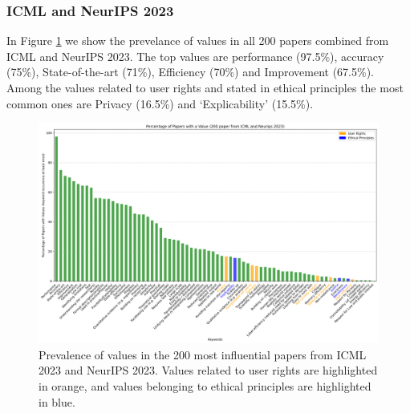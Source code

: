 \documentclass{article}
\begin{document}
\subsubsection{ICML and NeurIPS 2023}
In Figure \ref{fig:percentage_both_conferences} we show the prevelance of values in all 200 papers combined from ICML and NeurIPS 2023. The top values are performance (97.5\%), accuracy (75\%), 
State-of-the-art (71\%), Efficiency (70\%) and Improvement (67.5\%). Among the values related to user rights and stated in 
ethical principles the most common ones are Privacy (16.5\%) and `Explicability' (15.5\%). 

\begin{figure}[H]
    \centering
    \includegraphics[width=\textwidth]{../plots/percentage_both_conferences.png}
    \caption{Prevalence of values in the 200 most influential papers from ICML 2023 and NeurIPS 2023. Values related to user rights are highlighted in orange, and values belonging to ethical principles are highlighted in blue.}
    \label{fig:percentage_both_conferences}
\end{figure}
\end{document}
